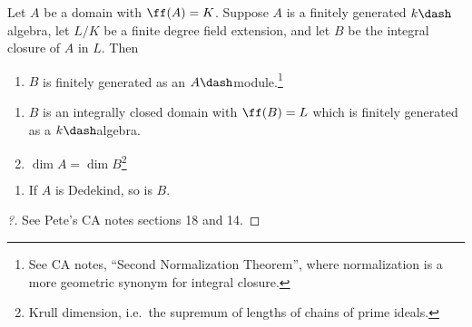 \begin{theorem}[?]

Let \(A\) be a domain with \(\ff(A) = K\). Suppose \(A\) is a finitely
generated \(k\dash\)algebra, let \(L/K\) be a finite degree field
extension, and let \(B\) be the integral closure of \(A\) in \(L\). Then

\begin{enumerate}
\def\labelenumi{\alph{enumi}.}
\tightlist
\item
  \(B\) is finitely generated as an \(A\dash\)module.\footnote{See CA
    notes, ``Second Normalization Theorem'', where normalization is a
    more geometric synonym for integral closure.}
\end{enumerate}

\begin{enumerate}
\def\labelenumi{\alph{enumi}.}
\setcounter{enumi}{1}
\item
  \(B\) is an integrally closed domain with \(\ff(B) = L\) which is
  finitely generated as a \(k\dash\)algebra.
\item
  \(\dim A = \dim B\)\footnote{Krull dimension, i.e.~the supremum of
    lengths of chains of prime ideals.}
\end{enumerate}

\begin{enumerate}
\def\labelenumi{\alph{enumi}.}
\setcounter{enumi}{3}
\tightlist
\item
  If \(A\) is Dedekind, so is \(B\).
\end{enumerate}

\end{theorem}

\begin{proof}[?]

See Pete's CA notes sections 18 and 14.

\end{proof}


